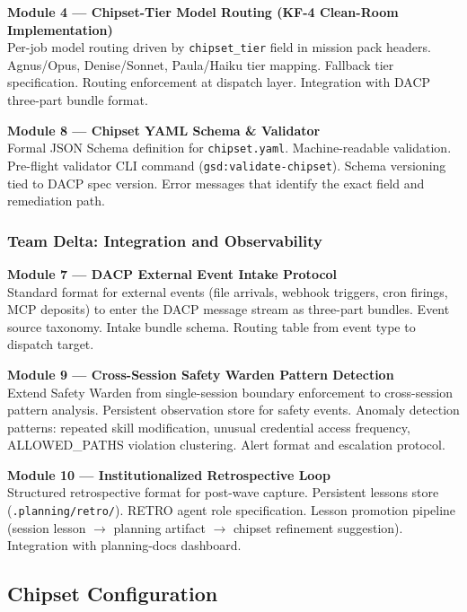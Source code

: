 \documentclass[11pt,letterpaper]{article}
\begin{document}
\textbf{Module 4 --- Chipset-Tier Model Routing (KF-4 Clean-Room Implementation)}\\
Per-job model routing driven by \texttt{chipset\_tier} field in mission pack headers. Agnus/Opus, Denise/Sonnet, Paula/Haiku tier mapping. Fallback tier specification. Routing enforcement at dispatch layer. Integration with DACP three-part bundle format.

\textbf{Module 8 --- Chipset YAML Schema \& Validator}\\
Formal JSON Schema definition for \texttt{chipset.yaml}. Machine-readable validation. Pre-flight validator CLI command (\texttt{gsd:validate-chipset}). Schema versioning tied to DACP spec version. Error messages that identify the exact field and remediation path.

\subsubsection{Team Delta: Integration and Observability}

\textbf{Module 7 --- DACP External Event Intake Protocol}\\
Standard format for external events (file arrivals, webhook triggers, cron firings, MCP deposits) to enter the DACP message stream as three-part bundles. Event source taxonomy. Intake bundle schema. Routing table from event type to dispatch target.

\textbf{Module 9 --- Cross-Session Safety Warden Pattern Detection}\\
Extend Safety Warden from single-session boundary enforcement to cross-session pattern analysis. Persistent observation store for safety events. Anomaly detection patterns: repeated skill modification, unusual credential access frequency, ALLOWED\_PATHS violation clustering. Alert format and escalation protocol.

\textbf{Module 10 --- Institutionalized Retrospective Loop}\\
Structured retrospective format for post-wave capture. Persistent lessons store (\texttt{.planning/retro/}). RETRO agent role specification. Lesson promotion pipeline (session lesson $\rightarrow$ planning artifact $\rightarrow$ chipset refinement suggestion). Integration with planning-docs dashboard.

\subsection{Chipset Configuration}
\end{document}

